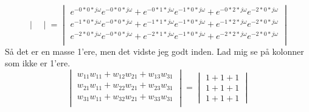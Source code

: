 \begin{Opgaver}
\begin{kapitel}
\begin{Opgave}
\begin{UnderOpgave}
\[\begin{vmatrix}
                \end{vmatrix}
                = 
                \begin{vmatrix}
                    e^{-0*0 * j\omega}e^{-0*0 * j\omega} + e^{-0*1 * j\omega}e^{-1*0 * j\omega} + e^{-0*2 * j\omega}e^{-2*0 * j\omega} \\
                    e^{-1*0 * j\omega}e^{-0*0 * j\omega} + e^{-1*1 * j\omega}e^{-1*0 * j\omega} + e^{-1*2 * j\omega}e^{-2*0 * j\omega} \\
                    e^{-2*0 * j\omega}e^{-0*0 * j\omega} + e^{-2*1 * j\omega}e^{-1*0 * j\omega} + e^{-2*2 * j\omega}e^{-2*0 * j\omega} \\
                \end{vmatrix}\]
                Så det er en masse 1'ere, men det vidste jeg godt inden. Lad mig se på kolonner som ikke er 1'ere.
                \[\begin{vmatrix}
                    w_{11}w_{11} + w_{12}w_{21} +w_{13}w_{31} \\
                    w_{21}w_{11} + w_{22}w_{21} +w_{23}w_{31} \\
                    w_{31}w_{11} + w_{32}w_{21} +w_{33}w_{31} \\
                \end{vmatrix}
                = 
                \begin{vmatrix}
                    1 + 1 + 1 \\
                    1 + 1 + 1 \\
                    1 + 1 + 1
                \end{vmatrix}\]\\\\



\end{UnderOpgave}
\end{Opgave}
\end{kapitel}
\end{Opgaver}
